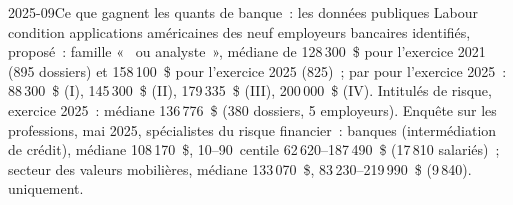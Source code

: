 \begin{dated}{2025-09}{Ce que gagnent les quants de banque~: les données publiques}\label{dat:in:bank-quant:pay}
Labour condition applications américaines des neuf employeurs bancaires identifiés,  proposé~: famille «~ ou
analyste~», médiane de 128\,300~\$ pour l'exercice 2021 (895 dossiers) et 158\,100~\$ pour l'exercice 2025 (825)~; par 
pour l'exercice 2025~: 88\,300~\$ (I), 145\,300~\$ (II), 179\,335~\$ (III), 200\,000~\$ (IV). Intitulés de risque, exercice 2025~: médiane
136\,776~\$ (380 dossiers, 5 employeurs). Enquête sur les professions, mai 2025, spécialistes du risque financier~: banques (intermédiation
de crédit), médiane 108\,170~\$, 10--90~centile 62\,620--187\,490~\$ (17\,810 salariés)~; secteur des valeurs mobilières, médiane
133\,070~\$, 83\,230--219\,990~\$ (9\,840).  uniquement.
\end{dated}

